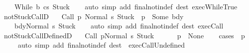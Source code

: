 \begin{isabellebody}
\ \ \ {\isasymLongrightarrow}\ {\isasymGamma}{\isasymturnstile}{\isasymlangle}While\ b\ c{\isacharcomma}s{\isacharprime}{\isasymrangle}\ {\isasymRightarrow}{\isasymnotin}{\isacharbraceleft}Stuck{\isacharbraceright}{\isachardoublequoteclose}\isanewline
%
\isadelimproof
\ \ %
\endisadelimproof
%
\isatagproof
{}\isamarkupfalse%
\ {\isacharparenleft}auto\ simp\ add{\isacharcolon}\ final{\isacharunderscore}notin{\isacharunderscore}def\ dest{\isacharcolon}\ exec{\isachardot}WhileTrue{\isacharparenright}%
\endisatagproof
{\isafoldproof}%
%
\isadelimproof
\isanewline
%
\endisadelimproof
\isanewline
{}\isamarkupfalse%
\ notStuck{\isacharunderscore}CallD{\isacharcolon}\ \isanewline
\ \ {\isachardoublequoteopen}{\isasymlbrakk}{\isasymGamma}{\isasymturnstile}{\isasymlangle}Call\ p\ {\isacharcomma}Normal\ s{\isasymrangle}\ {\isasymRightarrow}{\isasymnotin}{\isacharbraceleft}Stuck{\isacharbraceright}{\isacharsemicolon}\ {\isasymGamma}\ p\ {\isacharequal}\ Some\ bdy{\isasymrbrakk}\ \isanewline
\ \ \ {\isasymLongrightarrow}\ {\isasymGamma}{\isasymturnstile}{\isasymlangle}bdy{\isacharcomma}Normal\ s{\isasymrangle}\ {\isasymRightarrow}{\isasymnotin}{\isacharbraceleft}Stuck{\isacharbraceright}{\isachardoublequoteclose}\isanewline
%
\isadelimproof
\ \ %
\endisadelimproof
%
\isatagproof
{}\isamarkupfalse%
\ {\isacharparenleft}auto\ simp\ add{\isacharcolon}\ final{\isacharunderscore}notin{\isacharunderscore}def\ dest{\isacharcolon}\ exec{\isachardot}Call{\isacharparenright}%
\endisatagproof
{\isafoldproof}%
%
\isadelimproof
\isanewline
%
\endisadelimproof
\isanewline
{}\isamarkupfalse%
\ notStuck{\isacharunderscore}CallDefinedD{\isacharcolon}\ \isanewline
\ \ {\isachardoublequoteopen}{\isasymlbrakk}{\isasymGamma}{\isasymturnstile}{\isasymlangle}Call\ p{\isacharcomma}Normal\ s{\isasymrangle}\ {\isasymRightarrow}{\isasymnotin}{\isacharbraceleft}Stuck{\isacharbraceright}{\isasymrbrakk}\ \isanewline
\ \ \ {\isasymLongrightarrow}\ {\isasymGamma}\ p\ {\isasymnoteq}\ None{\isachardoublequoteclose}\isanewline
%
\isadelimproof
\ \ %
\endisadelimproof
%
\isatagproof
{}\isamarkupfalse%
\ {\isacharparenleft}cases\ {\isachardoublequoteopen}{\isasymGamma}\ p{\isachardoublequoteclose}{\isacharparenright}\ \isanewline
\ \ \ \ \ {\isacharparenleft}auto\ simp\ add{\isacharcolon}\ final{\isacharunderscore}notin{\isacharunderscore}def\ dest{\isacharcolon}\ \ exec{\isachardot}CallUndefined{\isacharparenright}%
\endisatagproof
{\isafoldproof}%
%
\isadelimproof
\isanewline
%
\endisadelimproof
\isanewline
{}\isamarkupfalse%

\end{isabellebody}

